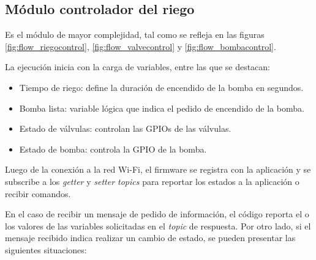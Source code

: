 \subsection{Módulo controlador del riego}
\label{Módulo controlador del riego}

Es el módulo de mayor complejidad, tal como se refleja en las figuras \ref{fig:flow_riegocontrol}, \ref{fig:flow_valvecontrol}  y \ref{fig:flow_bombacontrol}.

La ejecución inicia con la carga de variables, entre las que se destacan:
\begin{itemize}
\item Tiempo de riego: define la duración de encendido de la bomba en segundos.
\item Bomba lista: variable lógica que indica el pedido de encendido de la bomba.
\item Estado de válvulas: controlan las GPIOs de las válvulas.
\item Estado de bomba: controla la GPIO de la bomba.
\end{itemize}

Luego de la conexión a la red Wi-Fi, el firmware se registra con la aplicación y se subscribe a los \textit{getter} y \textit{setter topics} para reportar los estados a la aplicación o recibir comandos.


En el caso de recibir un mensaje de pedido de información, el código reporta el o los valores de las variables solicitadas en el \textit{topic} de respuesta. Por otro lado, si el mensaje recibido indica realizar un cambio de estado, se pueden presentar las siguientes situaciones:

